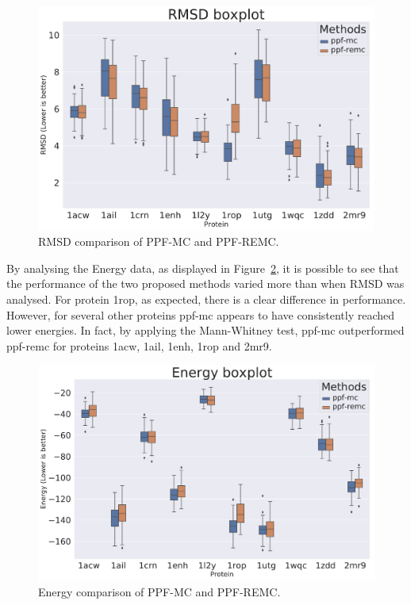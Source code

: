 \begin{figure}
  \centering
  \includegraphics[width=1\textwidth]{Figuras/boxplots/duel_boxplot_best_by_rmsd_rmsd_after.pdf}
  \caption{RMSD comparison of PPF-MC and PPF-REMC.}
  \label{fig:duel-boxplot-rmsd}
\end{figure}

By analysing the Energy data, as displayed in
Figure~\ref{fig:duel-boxplot-energy}, it is possible to see that the performance
of the two proposed methods varied more than when RMSD was analysed. For protein
1rop, as expected, there is a clear difference in performance. However, for
several other proteins ppf-mc appears to have consistently reached lower
energies. In fact, by applying the Mann-Whitney test, ppf-mc outperformed
ppf-remc for proteins 1acw, 1ail, 1enh, 1rop and 2mr9.

\begin{figure}
  \centering
  \includegraphics[width=1\textwidth]{Figuras/boxplots/duel_boxplot_best_by_energy_scorefxn}
  \caption{Energy comparison of PPF-MC and PPF-REMC.}
  \label{fig:duel-boxplot-energy}
\end{figure}

